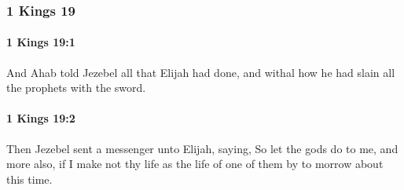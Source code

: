 	\subsubsection{1 Kings 19} %
		\label{1KINGS-19}

		\paragraph{1 Kings 19:1} %
			\label{1KINGS-19-1}

			And Ahab told Jezebel all that Elijah had done, and withal how he had slain all the prophets with the sword.


		\paragraph{1 Kings 19:2} %
			\label{1KINGS-19-2}

			Then Jezebel sent a messenger unto Elijah, saying, So let the gods do to me, and more also, if I make not thy life as the life of one of them by to morrow about this time.

